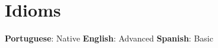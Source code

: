\documentclass[letterpaper,11pt]{article}
\begin{document}
\section{Idioms}
 \begin{itemize}[leftmargin=0.15in, label={}]
    \small{\item{
     \textbf{Portuguese}{: Native} \hspace{1cm}
     \textbf{English}{: Advanced}  \hspace{1cm}
     \textbf{Spanish}{: Basic} \\
    }}
 \end{itemize}


\end{document}

